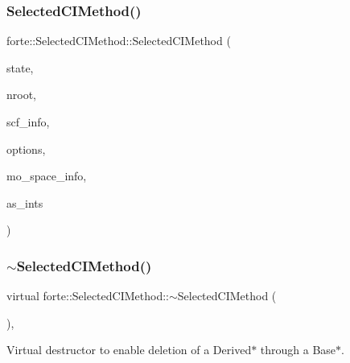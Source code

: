 \subsubsection{\texorpdfstring{Selected\+C\+I\+Method()}{SelectedCIMethod()}}
{\footnotesize\ttfamily forte\+::\+Selected\+C\+I\+Method\+::\+Selected\+C\+I\+Method (\begin{DoxyParamCaption}\item[{\mbox{\hyperlink{classforte_1_1_state_info}{State\+Info}}}]{state,  }\item[{size\+\_\+t}]{nroot,  }\item[{std\+::shared\+\_\+ptr$<$ \mbox{\hyperlink{classforte_1_1_s_c_f_info}{S\+C\+F\+Info}} $>$}]{scf\+\_\+info,  }\item[{std\+::shared\+\_\+ptr$<$ \mbox{\hyperlink{classforte_1_1_forte_options}{Forte\+Options}} $>$}]{options,  }\item[{std\+::shared\+\_\+ptr$<$ \mbox{\hyperlink{classforte_1_1_m_o_space_info}{M\+O\+Space\+Info}} $>$}]{mo\+\_\+space\+\_\+info,  }\item[{std\+::shared\+\_\+ptr$<$ \mbox{\hyperlink{classforte_1_1_active_space_integrals}{Active\+Space\+Integrals}} $>$}]{as\+\_\+ints }\end{DoxyParamCaption})}

\mbox{\label{classforte_1_1_selected_c_i_method_a1d6e4dad94655f4ad91e32d4afaf19a7}} 
\subsubsection{\texorpdfstring{$\sim$\+Selected\+C\+I\+Method()}{~SelectedCIMethod()}}
{\footnotesize\ttfamily virtual forte\+::\+Selected\+C\+I\+Method\+::$\sim$\+Selected\+C\+I\+Method (\begin{DoxyParamCaption}{ }\end{DoxyParamCaption})\hspace{0.3cm}{\ttfamily [virtual]}, {\ttfamily [default]}}



Virtual destructor to enable deletion of a Derived$\ast$ through a Base$\ast$. 



